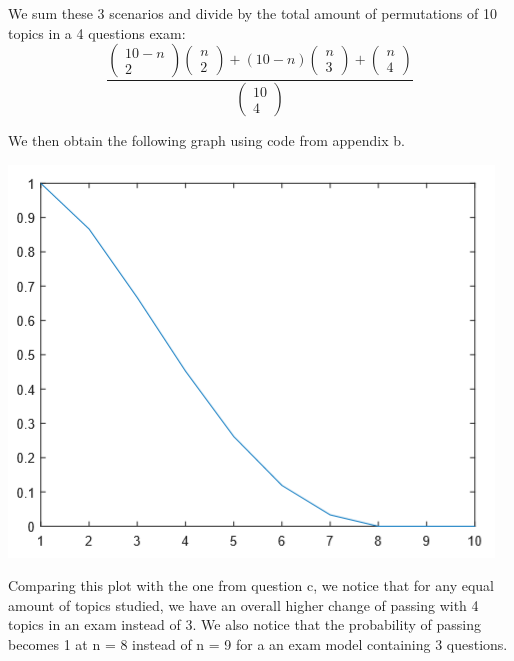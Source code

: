 \documentclass[14.5pt]{article}
\begin{document}
We sum these 3 scenarios and divide by the total amount of permutations of 10 topics in a 4 questions
exam:
\begin{equation}
    \frac{\begin{pmatrix} 10 - n \\ 2 \end{pmatrix}\begin{pmatrix} n \\ 2 \end{pmatrix}
        + (10 - n)\begin{pmatrix} n \\ 3 \end{pmatrix} + \begin{pmatrix} n \\ 4 \end{pmatrix}}
    {\begin{pmatrix} 10 \\ 4 \end{pmatrix}}
\end{equation}

We then obtain the following graph using code from appendix b.
\begin{center}
    \includegraphics[scale=0.5]{p2}
\end{center}

Comparing this plot with the one from question c, we notice that for any equal amount
of topics studied, we have an overall higher change of passing with 4 topics in an exam
instead of 3. We also notice that the probability of passing becomes 1 at n = 8 instead of n = 9
for a an exam model containing 3 questions.
\end{document}
